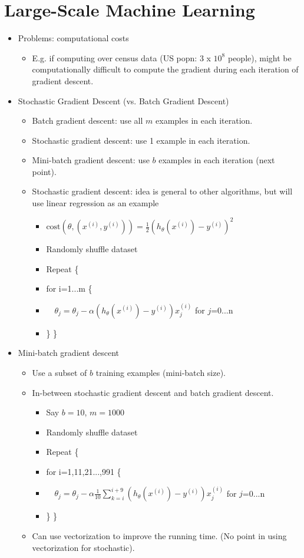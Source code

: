 \documentclass[letterpaper,10pt]{article}
\begin{document}
\section{Large-Scale Machine Learning}
\begin{itemize}
\item Problems: computational costs
	\begin{itemize}
	\item E.g. if computing over census data (US popn: 3 x $10^8$ people), might be computationally difficult to compute the gradient during each iteration of gradient descent.
	\end{itemize}

\item Stochastic Gradient Descent (vs. Batch Gradient Descent)
	\begin{itemize}
	\item Batch gradient descent: use all $m$ examples in each iteration.
	\item Stochastic gradient descent: use 1 example in each iteration.
	\item Mini-batch gradient descent: use $b$ examples in each iteration (next point).
	\item Stochastic gradient descent: idea is general to other algorithms, but will use linear regression as an example
		\begin{itemize}
		\item $\text{cost}(\theta, (x^{(i)}, y^{(i)}))=\frac{1}{2}\left( h_\theta(x^{(i)}) - y^{(i)} \right)^2$
		\item Randomly shuffle dataset
		\item Repeat \{
		\item for i=1...m \{
		\item $\quad \theta_j = \theta_j - \alpha \left( h_\theta(x^{(i)}) - y^{(i)} \right)x_j^{(i)}$ for $j$=0...n
		\item \} \}
		\end{itemize}
	\end{itemize}

\item Mini-batch gradient descent
	\begin{itemize}
	\item Use a subset of $b$ training examples (mini-batch size).
	\item In-between stochastic gradient descent and batch gradient descent.
		\begin{itemize}
		\item Say $b=10$, $m=1000$
		\item Randomly shuffle dataset
		\item Repeat \{
		\item for i=1,11,21...,991 \{
		\item $\quad \theta_j = \theta_j - \alpha \frac{1}{10} \sum_{k=i}^{i+9} \left( h_\theta(x^{(i)}) - y^{(i)} \right)x_j^{(i)}$ for $j$=0...n
		\item \} \}
		\end{itemize}
	\item Can use vectorization to improve the running time. (No point in using vectorization for stochastic).
	\end{itemize}


\end{itemize}
\end{document}
